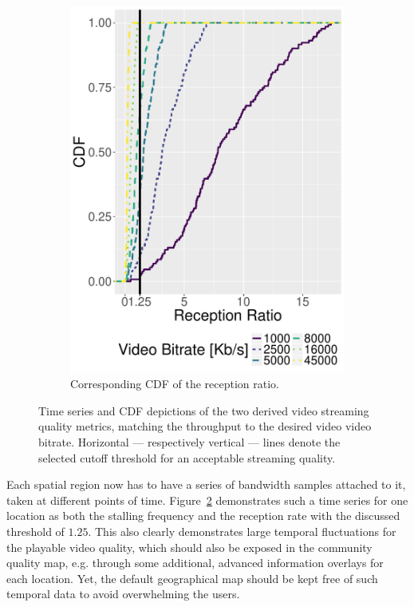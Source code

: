 \begin{figure}[!t]
\begin{subfigure}[b]{0.45\columnwidth}
        \includegraphics[width=\textwidth]{images/receptionratio-cdf.pdf}
        \caption{Corresponding CDF of the reception ratio.}
        \label{fig:receptionratio-cdf}
    \end{subfigure}
    \caption{Time series and \acrshort{CDF} depictions of the two derived video streaming quality metrics, matching the throughput to the desired video video bitrate. Horizontal --- respectively vertical --- lines denote the selected cutoff threshold for an acceptable streaming quality.}
    \label{fig:timeseries}
\end{figure}

Each spatial region now has to have a series of bandwidth samples attached to it, taken at different points of time. Figure~\ref{fig:timeseries} demonstrates such a time series for one location as both the stalling frequency and the reception rate with the discussed threshold of $1.25$. This also clearly demonstrates large temporal fluctuations for the playable video quality, which should also be exposed in the community quality map, e.g. through some additional, advanced information overlays for each location. Yet, the default geographical map should be kept free of such temporal data to avoid overwhelming the users.

